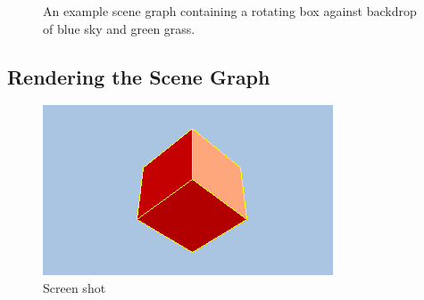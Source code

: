 \documentclass[10pt,aps, prb,preprint]{article}
\begin{document}
\begin{figure}[!h]
\begin{center}
\caption{\label{fig:scene}An example scene graph containing a rotating box against backdrop of blue sky and green grass.}
\end{center}
\end{figure}


\subsection{Rendering the Scene Graph}

\begin{figure}[!h]
\label{fig:layerScene}
\begin{center}
\includegraphics{cubeimage.png}
\caption{Screen shot}
\end{center}
\end{figure}
\end{document}
